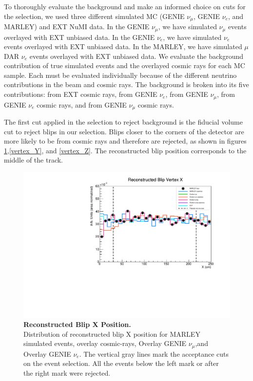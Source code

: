 To thoroughly evaluate the background and make an informed choice on cuts for the selection, we used three different simulated MC (GENIE $\nu_{\mu}$, GENIE $\nu_{e}$, and MARLEY) and EXT NuMI data. In the GENIE $\nu_{\mu}$, we have simulated $\nu_{\mu}$ events overlayed with EXT unbiased data. In the GENIE $\nu_{e}$, we have simulated $\nu_{e}$ events overlayed with EXT unbiased data. In the MARLEY, we have simulated $\mu$DAR $\nu_e$ events overlayed with EXT unbiased data. We evaluate the background contribution of true simulated events and the overlayed cosmic rays for each MC sample. Each must be evaluated individually because of the different neutrino contributions in the beam and cosmic rays. The background is broken into its five contributions: from EXT cosmic rays, from GENIE $\nu_{e}$, from GENIE $\nu_{\mu}$, from GENIE $\nu_{e}$ cosmic rays, and from GENIE $\nu_{\mu}$ cosmic rays. 

The first cut applied in the selection to reject background is the fiducial volume cut to reject blips in our selection. Blips closer to the corners of the detector are more likely to be from cosmic rays and therefore are rejected, as shown in figures \ref{vertex_X},\ref{vertex_Y}, and \ref{vertex_Z}. The reconstructed blip position corresponds to the middle of the track. 

\begin{figure}[h!]
    \centering
    \includegraphics[width=120mm]{Figures/vertex_X.pdf}
    \caption[Reconstructed Blip X Position.]{{\textbf{Reconstructed Blip X Position.}}\\ Distribution of reconstructed blip X position for MARLEY simulated events, overlay cosmic-rays, Overlay GENIE $\nu_{\mu}$,and Overlay GENIE $\nu_{e}$. The vertical gray lines mark the acceptance cuts on the event selection. All the events below the left mark or after the right mark were rejected.}
    \label{vertex_X}
\end{figure}

